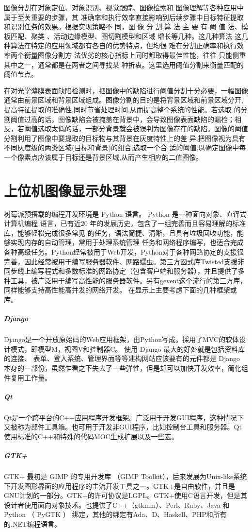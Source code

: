 图像分割在对象定位、对象识别、视觉跟踪、图像检索和
图像理解等各种应用中属于至关重要的步骤，其
准确率和执行效率直接影响到后续步骤中目标特征提取和识别任务的效果。根据实现策略不
同，图 像 分 割 算 法 主 要 有 阈 值 法、模板匹配、聚类
、活动边缘模型、图切割模型和区域
增长等几种。这几种算法
这几种算法在特定的应用领域都有各自的优势特点，但均很
难在分割正确率和执行效率两个衡量图像分割方
法优劣的核心指标上同时都取得最佳性能，往往
只能侧重其中之一，通常都是在两者之间寻找某
种折衷。这里选用阈值分割来衡量匹配的阈值节点\cite{fenge}。


在对光学薄膜表面缺陷检测时，把图像中的缺陷进行阈值分割十分必要，一幅图像通常由前景区域和背景区域组成。图像分割的目的是将背景区域和前景区域分开,提高特征提取的准确性,同时节省处理时间,从而提高整个系统的性能。若选取
的分割阈值过高的话，图像缺陷会被掩盖在背景中，会导致图像表面缺陷的漏检；相 反，若阈值选取太低的话，一部分背景就会被误判为图像存在的缺陷。图像的阈值分割利用了图像中要提取的目标物与其背景在灰度特性上的差
异,把图像视为具有不同灰度级的两类区域(目标和背景)的组合,选取一个合
适的阈值,以确定图像中每一个像素点应该属于目标还是背景区域,从而产生相应的二值图像\cite{guleialgo}。



\section{上位机图像显示处理}
树莓派预搭载的编程开发环境是 Python 语言。 Python 是一种面向对象、直译式计算机编程
语言，已有近20 年的发展历史，包含了一组完善而且容易理解的标准库，能够轻松完成很多常见
的任务，语法简捷、清晰，且具有垃圾回收功能，能够实现内存的自动管理，常用于处理系统管理
任务和网络程序编写，也适合完成各种高级任务。Python经常被用于Web开发，Python对于各种网路协定的支援很完善，因此经常被用于编写服务器软件、网路蠕虫。第三方函式库Twisted支援非同步线上编写程式和多数标准的网路协定（包含客户端和服务器），并且提供了多种工具，被广泛用于编写高性能的服务器软件。另有gevent这个流行的第三方库，同样能够支持高性能高并发的网络开发\cite{raspnet}。
在显示上主要考虑下面的几种框架或库\cite{rasgpio}。

\subparagraph{Django}
Django是一个开放原始码的Web应用框架，由Python写成。採用了MVC的软体设计模式，即模型M，视图V和控制器C。
使用 Django 最大的好处就是包括资料库的连接、 表单、登入系统、管理界面等等建构网站应该要有的元件都是 Django 本身的一部份，虽然乍看之下失去了一些弹性，但是却可以加快开发效率，简化组件复用工作量。

\subparagraph{Qt}
Qt是一个跨平台的C++应用程序开发框架。广泛用于开发GUI程序，这种情况下又被称为部件工具箱。也可用于开发非GUI程序，比如控制台工具和服务器。Qt使用标准的C++和特殊的代码MOC生成扩展以及一些宏。
\subparagraph{GTK+}
GTK+ 最初是 GIMP 的专用开发库 （GIMP Toolkit），后来发展为Unix-like系统下开发图形界面的应用程序的主流开发工具之一。GTK+是自由软件，并且是GNU计划的一部分。GTK+的许可协议是LGPL。GTK+使用C语言开发，但是其设计者使用面向对象技术。也提供了C++（gtkmm）、Perl、Ruby、Java 和 Python （ PyGTK ） 绑定，其他的绑定有Ada、D、Haskell、PHP和所有的.NET编程语言。


